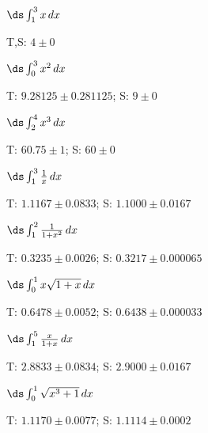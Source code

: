 \begin{enumialphparenastyle}
\begin{ex}
 $\ds\int_1^3 x\,dx$
\begin{sol}
 T,S: $4\pm0$
\end{sol}
\end{ex}

\begin{ex}
 $\ds\int_0^3 x^2\,dx$
\begin{sol}
 T: $9.28125\pm0.281125 $; S: $9\pm0$
\end{sol}
\end{ex}

\begin{ex}
 $\ds\int_2^4 x^3\,dx$
\begin{sol}
 T: $60.75\pm1$; S: $60\pm0$
\end{sol}
\end{ex}

\begin{ex}
 $\ds\int_1^3 {1\over x}\,dx$
\begin{sol}
 T: $1.1167\pm 0.0833$; S: $1.1000\pm 0.0167$
\end{sol}
\end{ex}

\begin{ex}
 $\ds\int_1^2 {1\over 1+x^2}\,dx$
\begin{sol}
 T: $0.3235\pm 0.0026$; S: $0.3217\pm 0.000065$
\end{sol}
\end{ex}

\begin{ex}
 $\ds\int_0^1 x\sqrt{1+x}\,dx$
\begin{sol}
 T: $0.6478\pm 0.0052$; S: $0.6438\pm 0.000033$
\end{sol}
\end{ex}

\begin{ex}
 $\ds\int_1^5 {x\over 1+x}\,dx$
\begin{sol}
 T: $2.8833\pm 0.0834$; S: $2.9000\pm 0.0167$
\end{sol}
\end{ex}

\begin{ex}
 $\ds\int_0^1 \sqrt{x^3+1}\,dx$
\begin{sol}
 T: $1.1170\pm 0.0077$; S: $1.1114\pm 0.0002$
\end{sol}
\end{ex}


\end{enumialphparenastyle}
